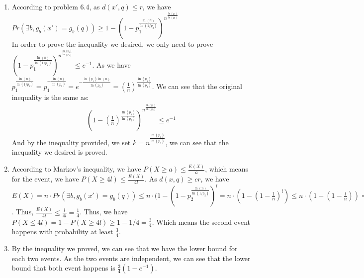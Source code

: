 \documentclass{article}
\begin{document}
\subsection{}
\begin{enumerate}
    \item According to problem 6.4, as $ d(x',q)\leq r $, we have $ Pr(\exists b, g_b(x')=g_b(q))\geq 1-(1-p_1^{\frac{\ln(n )}{\ln(1/p_2)}})^{n^{\frac{\ln(p_1 )}{\ln(p_2)}}} $\\
        In order to prove the inequality we desired, we only need to prove $ (1-p_1^{\frac{\ln(n )}{\ln(1/p_2)}})^{n^{\frac{\ln(p_1 )}{\ln(p_2)}}} \leq e^{-1} $. As we have $ p_1^{\frac{\ln(n) }{\ln{(1/p_2)}}} = p_1^{-\frac{\ln(n )}{\ln{(p_2)}}} = e^{-\frac{\ln(p_1)\ln(n)}{\ln(p_2)}} = (\frac{1}{n})^ {\frac{\ln(p_1)}{\ln(p_2)}} $. We can see that the original inequality is the same as:
        \begin{align*}
            \left(1 - \left(\frac{1}{n }\right)^{\frac{\ln(p_1)}{\ln(p_2)}}\right)^ {n ^ {\frac{\ln(p_1 )}{\ln(p_2)}}} \leq e^{-1}
        \end{align*}
        And by the inequality provided, we set $ k = n ^ {\frac{\ln(p_1 )}{\ln(p_2 )}} $, we can see that the inequality we desired is proved.
    \item According to Markov's inequality, we have $ P(X\geq a)\leq \frac{E(X)}{a} $, which means for the event, we have $ P(X\geq 4l) \leq \frac{E(X)}{4l} $. As $ d(x, q)\geq cr $, we have $ E(X) = n\cdot Pr(\exists b, g_b(x')=g_b(q)) \leq n\cdot (1-(1-p_2^{\frac{\ln(n) }{\ln(1/p_2)}})^l = n\cdot (1-(1-\frac{1}{n})^ {l}) \leq n\cdot (1-(1- \frac{l}{n}))= l $. Thus, $ \frac{E(X)}{4l}\leq \frac{l}{4l} = \frac{1}{4} $. Thus, we have $ P(X\leq 4l) = 1-P(X\geq 4l) \geq 1 - 1/4 = \frac{3}{4} $. Which means the second event happens with probability at least $ \frac{3}{4} $. 
    \item By the inequality we proved, we can see that we have the lower bound for each two events. As the two events are independent, we can see that the lower bound that both event happens is $ \frac{3}{4} (1-e^{-1}) $.
\end{enumerate}
\end{document}
